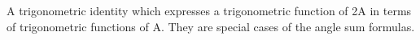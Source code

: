 A trigonometric identity which expresses a trigonometric function of
2A in terms of trigonometric functions of A. They are special cases
of the angle sum formulas.